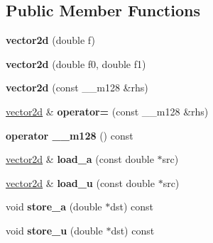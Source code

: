 \subsection*{Public Member Functions}
\begin{DoxyCompactItemize}
\item 
\hypertarget{classsimd_1_1vector2d_a0e3a7eb244e825f7809aeca6c4015432}{{\bfseries vector2d} (double f)}\label{classsimd_1_1vector2d_a0e3a7eb244e825f7809aeca6c4015432}

\item 
\hypertarget{classsimd_1_1vector2d_a6bb8da073bec335551b009a92b7836e2}{{\bfseries vector2d} (double f0, double f1)}\label{classsimd_1_1vector2d_a6bb8da073bec335551b009a92b7836e2}

\item 
\hypertarget{classsimd_1_1vector2d_af5018df52051248f830d1d763733bd10}{{\bfseries vector2d} (const \+\_\+\+\_\+m128 \&rhs)}\label{classsimd_1_1vector2d_af5018df52051248f830d1d763733bd10}

\item 
\hypertarget{classsimd_1_1vector2d_ae0f759e6c5ad3236b64324883ef56362}{\hyperlink{classsimd_1_1vector2d}{vector2d} \& {\bfseries operator=} (const \+\_\+\+\_\+m128 \&rhs)}\label{classsimd_1_1vector2d_ae0f759e6c5ad3236b64324883ef56362}

\item 
\hypertarget{classsimd_1_1vector2d_a6d9c6d2fdcfd79caed0e0ca4ba6c4193}{{\bfseries operator \+\_\+\+\_\+m128} () const }\label{classsimd_1_1vector2d_a6d9c6d2fdcfd79caed0e0ca4ba6c4193}

\item 
\hypertarget{classsimd_1_1vector2d_a48343c3ce199a62c94a3628f4a9b8356}{\hyperlink{classsimd_1_1vector2d}{vector2d} \& {\bfseries load\+\_\+a} (const double $\ast$src)}\label{classsimd_1_1vector2d_a48343c3ce199a62c94a3628f4a9b8356}

\item 
\hypertarget{classsimd_1_1vector2d_aef41f161d484e293b5ed6f041cabc362}{\hyperlink{classsimd_1_1vector2d}{vector2d} \& {\bfseries load\+\_\+u} (const double $\ast$src)}\label{classsimd_1_1vector2d_aef41f161d484e293b5ed6f041cabc362}

\item 
\hypertarget{classsimd_1_1vector2d_ac7f65ddb8522ad00471574e00be3f0fe}{void {\bfseries store\+\_\+a} (double $\ast$dst) const }\label{classsimd_1_1vector2d_ac7f65ddb8522ad00471574e00be3f0fe}

\item 
\hypertarget{classsimd_1_1vector2d_a447736062fd8f0edd65db761cbe9a0fc}{void {\bfseries store\+\_\+u} (double $\ast$dst) const }\label{classsimd_1_1vector2d_a447736062fd8f0edd65db761cbe9a0fc}


\end{DoxyCompactItemize}
